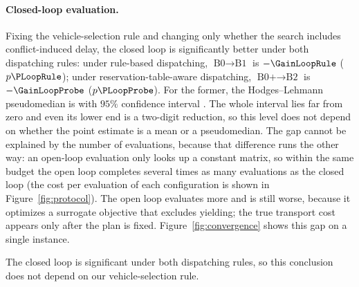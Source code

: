\paragraph{Closed-loop evaluation.}
Fixing the vehicle-selection rule and changing only whether the search includes conflict-induced delay, the closed loop is significantly better under both dispatching rules: under rule-based dispatching,
$\text{B0}\to\text{B1}$ is $-\GainLoopRule$ ($p\PLoopRule$); under reservation-table-aware dispatching,
$\text{B0+}\to\text{B2}$ is $-\GainLoopProbe$ ($p\PLoopProbe$).
For the former, the Hodges--Lehmann pseudomedian is \HLLoopRule{} with $95\%$ confidence interval \CILoopRule{}. The whole interval lies far from zero and even its lower end is a two-digit reduction, so this level does not depend on whether the point estimate is a mean or a pseudomedian.
The gap cannot be explained by the number of evaluations, because that difference runs the other way: an open-loop evaluation only looks up a constant matrix, so within the same budget the open loop completes several times as many evaluations as the closed loop (the cost per evaluation of each configuration is shown in Figure~\ref{fig:protocol}).
The open loop evaluates more and is still worse, because it optimizes a surrogate objective that excludes yielding; the true transport cost appears only after the plan is fixed.
Figure~\ref{fig:convergence} shows this gap on a single instance.

The closed loop is significant under both dispatching rules, so this conclusion does not depend on our vehicle-selection rule.

